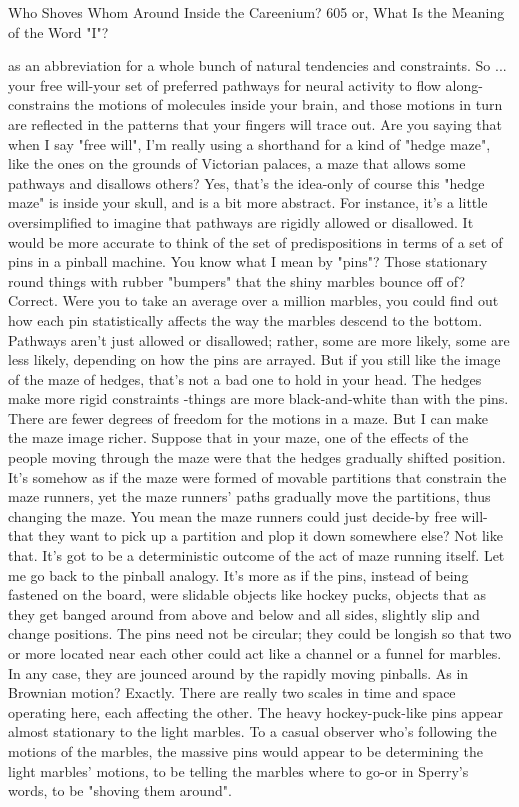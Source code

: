 Who Shoves Whom Around Inside the Careenium?                                        605
or, What Is the Meaning of the Word "I"?

  as an abbreviation for a whole bunch of natural tendencies and constraints. So ...
  your free will-your set of preferred pathways for neural activity to flow along-
  constrains the motions of molecules inside your brain, and those motions in turn
  are reflected in the patterns that your fingers will trace out.
\achilles Are you saying that when I say "free will", I'm really using a shorthand
  for a kind of "hedge maze", like the ones on the grounds of Victorian palaces, a
  maze that allows some pathways and disallows others?
\tortoise Yes, that's the idea-only of course this "hedge maze" is inside your skull,
  and is a bit more abstract. For instance, it's a little oversimplified to imagine that
  pathways are rigidly allowed or disallowed. It would be more accurate to think of
  the set of predispositions in terms of a set of pins in a pinball machine. You know
  what I mean by "pins"?
\achilles Those stationary round things with rubber "bumpers" that the shiny
  marbles bounce off of?
\tortoise Correct. Were you to take an average over a million marbles, you could
  find out how each pin statistically affects the way the marbles descend to the
  bottom. Pathways aren't just allowed or disallowed; rather, some are more likely,
  some are less likely, depending on how the pins are arrayed. But if you still like the
  image of the maze of hedges, that's not a bad one to hold in your head. The hedges
  make more rigid constraints -things are more black-and-white than with the pins.
  There are fewer degrees of freedom for the motions in a maze. But I can make the
  maze image richer. Suppose that in your maze, one of the effects of the people
  moving through the maze were that the hedges gradually shifted position. It's
  somehow as if the maze were formed of movable partitions that constrain the maze
  runners, yet the maze runners' paths gradually move the partitions, thus changing
  the maze.
\achilles You mean the maze runners could just decide-by free will-that they want
  to pick up a partition and plop it down somewhere else?
\tortoise Not like that. It's got to be a deterministic outcome of the act of maze
  running itself. Let me go back to the pinball analogy. It's more as if the pins,
  instead of being fastened on the board, were slidable objects like hockey pucks,
  objects that as they get banged around from above and below and all sides, slightly
  slip and change positions. The pins need not be circular; they could be longish so
  that two or more located near each other could act like a channel or a funnel for
  marbles. In any case, they are jounced around by the rapidly moving pinballs.
\achilles As in Brownian motion?
\tortoise Exactly. There are really two scales in time and space operating here,
  each affecting the other. The heavy hockey-puck-like pins appear almost stationary
  to the light marbles. To a casual observer who's following the motions of the
  marbles, the massive pins would appear to be determining the light marbles'
  motions, to be telling the marbles where to go-or in Sperry's words, to be "shoving
  them around".




